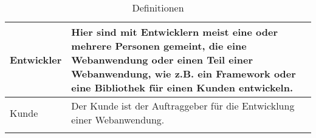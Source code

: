\begin{longtable}{| p{} | p{} |}
Entwickler\index{Entwickler} & Hier sind mit Entwicklern meist eine oder mehrere Personen gemeint, die eine Webanwendung oder einen Teil einer Webanwendung, wie z.B. ein Framework oder eine Bibliothek  für einen Kunden entwickeln.\\
\hline

Kunde \index{Kunde}& Der Kunde ist der Auftraggeber für die Entwicklung einer Webanwendung.\\
\hline

\caption{Definitionen}\label{tab:definitionen}
\end{longtable}